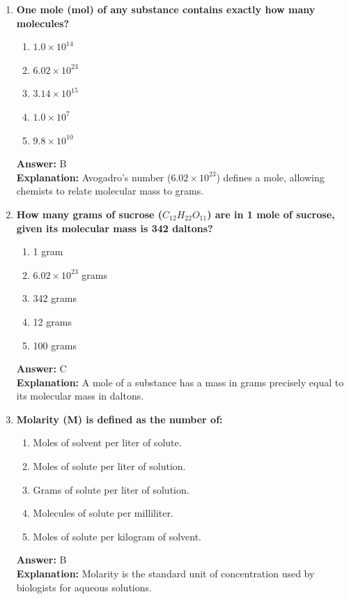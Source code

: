 \documentclass[11pt, a4paper]{article}
\begin{document}
\begin{enumerate}
\item \textbf{One mole (mol) of any substance contains exactly how many molecules?}
\begin{enumerate}[label=\Alph*.]
    \item $1.0 \times 10^{14}$
    \item $6.02 \times 10^{23}$
    \item $3.14 \times 10^{15}$
    \item $1.0 \times 10^7$
    \item $9.8 \times 10^{10}$
\end{enumerate}
\textbf{Answer:} B \\
\textbf{Explanation:} Avogadro's number ($6.02 \times 10^{23}$) defines a mole, allowing chemists to relate molecular mass to grams.

\item \textbf{How many grams of sucrose ($C_{12}H_{22}O_{11}$) are in 1 mole of sucrose, given its molecular mass is 342 daltons?}
\begin{enumerate}[label=\Alph*.]
    \item 1 gram
    \item $6.02 \times 10^{23}$ grams
    \item 342 grams
    \item 12 grams
    \item 100 grams
\end{enumerate}
\textbf{Answer:} C \\
\textbf{Explanation:} A mole of a substance has a mass in grams precisely equal to its molecular mass in daltons.

\item \textbf{Molarity (M) is defined as the number of:}
\begin{enumerate}[label=\Alph*.]
    \item Moles of solvent per liter of solute.
    \item Moles of solute per liter of solution.
    \item Grams of solute per liter of solution.
    \item Molecules of solute per milliliter.
    \item Moles of solute per kilogram of solvent.
\end{enumerate}
\textbf{Answer:} B \\
\textbf{Explanation:} Molarity is the standard unit of concentration used by biologists for aqueous solutions.



\end{enumerate}
\end{document}
